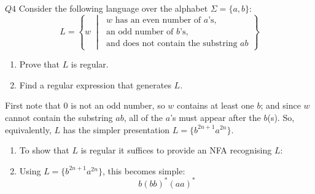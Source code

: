 \documentclass{article}
\theoremstyle{definition}
\theoremstyle{definition}
\theoremstyle{remark}
\begin{document}
\begin{questionbox}{$Q4$}
    Consider the following language over the alphabet $\Sigma=\{a,b\}$:
    \begin{equation*}
        L=\left\{w\;\middle|\;\begin{gathered}
            w\text{ has an even number of }a\text{'s,}\\
            \text{an odd number of }b\text{'s,}\\
            \text{and does not contain the substring }ab
        \end{gathered}
        \right\}
    \end{equation*}
    \begin{enumerate}
        \item[$(i)$] Prove that $L$ is regular.
        
        \item[$(ii)$] Find a regular expression that generates $L$.
    \end{enumerate}
\end{questionbox}

\bigskip


First note that $0$ is not an odd number, so $w$ contains at least one $b$; and since $w$ cannot contain the substring $ab$, all of the $a$'s must appear after the $b$(s). So, equivalently, $L$ has the simpler presentation $L=\{b^{2n+1}a^{2n}\}$.

\begin{enumerate}
    \item[$(i)$] To show that $L$ is regular it suffices to provide an NFA recognising $L$:
    \begin{center}
    \end{center}
    
    \item[$(ii)$] Using $L=\{b^{2n+1}a^{2n}\}$, this becomes simple:
    \begin{equation*}
        b(bb)^\ast(aa)^\ast
    \end{equation*}
\end{enumerate}
\end{document}
